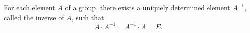 For each element $A$ of a group, there exists a uniquely determined element $A^{-1}$, called the inverse of $A$, such that
$$A \cdot A^{-1} = A^{-1} \cdot A = E.$$

